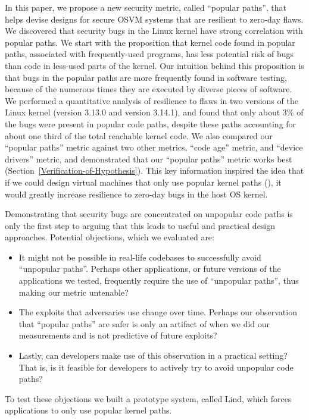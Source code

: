 In this paper, we propose a new security metric, called ``popular paths'', that helps devise designs for secure OSVM systems that are
resilient to zero-day flaws. 
We discovered that security bugs in the Linux kernel have strong correlation with popular paths. 
We start with the proposition that kernel code found in popular paths, associated with frequently-used programs,
has less potential risk of bugs than code in less-used parts of the kernel.
Our intuition behind this proposition is that bugs in the popular paths are
more frequently found in software testing, because of the numerous times they are executed by
diverse pieces of software.
We performed a quantitative analysis of resilience
to flaws in two versions of the Linux kernel (version 3.13.0 and version 3.14.1), and
found that only about 3\% of the bugs were present in popular code paths,
despite these paths accounting for about one third of the total reachable
kernel code. 
We also compared our ``popular paths'' metric against two other metrics, ``code age'' metric, and ``device drivers'' metric, 
and demonstrated that our ``popular paths'' metric works best (Section~{\ref{Verification-of-Hypothesis}}).  
This key information inspired the idea that 
if we could design virtual machines that only use popular kernel paths (\lip), 
it would greatly increase resilience to zero-day bugs in the host OS kernel. 

Demonstrating that security bugs are concentrated on unpopular
code paths is only the first step to arguing that this leads to useful and
practical design approaches.  Potential objections, which we evaluated are:
\begin{itemize}
\item It might not be possible in real-life codebases to successfully avoid ``unpopular paths''. 
Perhaps other applications, or future versions of the applications we tested, frequently require the use of ``unpopular paths'', thus making our metric untenable?
\item The exploits that adversaries use change over time. 
Perhaps our observation that ``popular paths'' are safer is only an artifact of when we did our measurements and is not predictive of future exploits?
\item Lastly, can developers make use of this observation in a practical setting?  That is, is it feasible for developers to actively try to avoid unpopular code paths?
\end{itemize}
To test these objections we built a prototype system, called Lind, which forces applications
to only use popular kernel paths.

